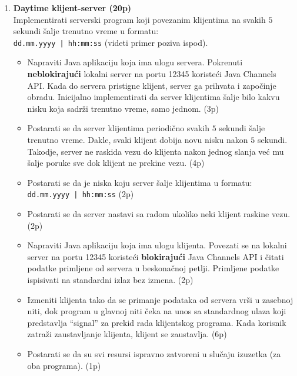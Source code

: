 \documentclass[]{article}
\begin{document}
\begin{enumerate}

  \item \textbf{Daytime klijent-server (20p)}
  \\Implementirati serverski program koji povezanim klijentima na svakih $5$ sekundi \v{s}alje trenutno vreme u formatu:\\
  \texttt{dd.mm.yyyy | hh:mm:ss} (videti primer poziva ispod).
  \begin{itemize}
    \item Napraviti Java aplikaciju koja ima ulogu servera. Pokrenuti \textbf{neblokiraju\'c{}i} lokalni server na portu 12345 koriste\'c{}i Java Channels API. Kada do servera pristigne klijent, server ga prihvata i zapo\v{c}inje obradu. Inicijalno implementirati da server klijentima \v{s}alje bilo kakvu nisku koja sadr\v{z}i trenutno vreme, samo jednom. \hfill (3p)
    \item Postarati se da server klijentima periodi\v{c}no svakih $5$ sekundi \v{s}alje trenutno vreme. Dakle, svaki klijent dobija novu nisku nakon $5$ sekundi. Takodje, server ne raskida vezu do klijenta nakon jednog slanja ve\'c{} mu \v{s}alje poruke sve dok klijent ne prekine vezu. \hfill (4p)
    \item Postarati se da je niska koju server \v{s}alje klijentima u formatu:\\
    \texttt{dd.mm.yyyy | hh:mm:ss} \hfill (2p)
    \item Postarati se da server nastavi sa radom ukoliko neki klijent raskine vezu. \hfill (2p)
    \item Napraviti Java aplikaciju koja ima ulogu klijenta. Povezati se na lokalni server na portu 12345 koriste\'c{}i \textbf{blokiraju\'c{}i} Java Channels API i \v{c}itati podatke primljene od servera u beskona\v{c}noj petlji. Primljene podatke ispisivati na standardni izlaz bez izmena. \hfill (2p)
    \item Izmeniti klijenta tako da se primanje podataka od servera vr\v{s}i u zasebnoj niti, dok program u glavnoj niti \v{c}eka na unos sa standardnog ulaza koji predstavlja ``signal'' za prekid rada klijentskog programa. Kada korisnik zatra\v{z}i zaustavljanje klijenta, klijent se zaustavlja. \hfill (6p)
    \item Postarati se da su svi resursi ispravno zatvoreni u slu\v{c}aju izuzetka (za oba programa). \hfill (1p)
  \end{itemize}


\end{enumerate}
\end{document}
